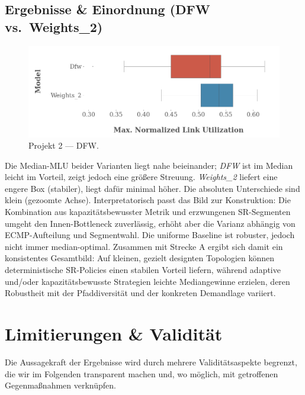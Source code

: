 \documentclass[sigconf,nonacm,review]{acmart}
\begin{document}
\subsection{Ergebnisse \& Einordnung (DFW vs.\ Weights\_2)}
\begin{figure}[H]
  \centering
  \includegraphics[width=.9\linewidth]{Dfw_weights_2.png}
  \caption{Projekt 2 — DFW.}
  \label{fig:p2-dfw}
\end{figure}
\noindent
Die Median-MLU beider Varianten liegt nahe beieinander; \emph{DFW} ist im Median leicht im Vorteil, zeigt jedoch
eine größere Streuung. \emph{Weights\_2} liefert eine engere Box (stabiler), liegt dafür minimal höher. Die
absoluten Unterschiede sind klein (gezoomte Achse). Interpretatorisch passt das Bild zur Konstruktion: Die
Kombination aus kapazitätsbewusster Metrik und erzwungenen SR-Segmenten umgeht den Innen-Bottleneck zuverlässig,
erhöht aber die Varianz abhängig von ECMP-Aufteilung und Segmentwahl. Die uniforme Baseline ist robuster, jedoch
nicht immer median-optimal. Zusammen mit Strecke A ergibt sich damit ein konsistentes Gesamtbild: Auf kleinen,
gezielt designten Topologien können deterministische SR-Policies einen stabilen Vorteil liefern, während adaptive
und/oder kapazitätsbewusste Strategien leichte Mediangewinne erzielen, deren Robustheit mit der Pfaddiversität
und der konkreten Demandlage variiert.


\FloatBarrier
\section{Limitierungen \& Validität}
Die Aussagekraft der Ergebnisse wird durch mehrere Validitätsaspekte begrenzt, die wir im Folgenden transparent machen und, wo möglich, mit getroffenen Gegenmaßnahmen verknüpfen.
\end{document}
